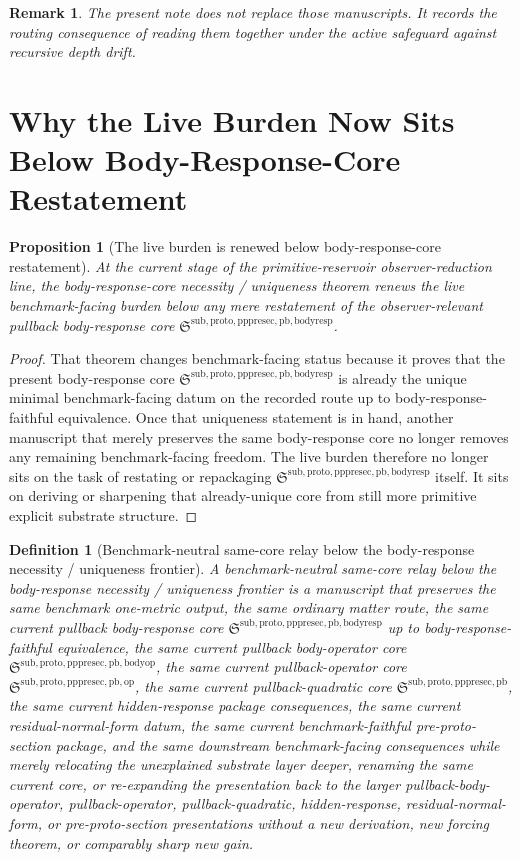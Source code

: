 \documentclass[11pt]{article}
\newcommand{\PrePreProtoSectionPullbackCore}{\mathfrak S^{\mathrm{sub,proto,pppresec,pb}}}
\newcommand{\PullbackOperatorCore}{\mathfrak S^{\mathrm{sub,proto,pppresec,pb,op}}}
\newcommand{\PullbackBodyOperatorCore}{\mathfrak S^{\mathrm{sub,proto,pppresec,pb,bodyop}}}
\newcommand{\PullbackBodyResponseCore}{\mathfrak S^{\mathrm{sub,proto,pppresec,pb,bodyresp}}}
\newtheorem{definition}{Definition}
\newtheorem{proposition}{Proposition}
\newtheorem{remark}{Remark}
\begin{document}
\begin{remark}
The present note does not replace those manuscripts. It records the routing consequence of reading them together under the active safeguard against recursive depth drift.
\end{remark}

\section{Why the Live Burden Now Sits Below Body-Response-Core Restatement}

\begin{proposition}[The live burden is renewed below body-response-core restatement]
At the current stage of the primitive-reservoir observer-reduction line, the body-response-core necessity / uniqueness theorem renews the live benchmark-facing burden below any mere restatement of the observer-relevant pullback body-response core \(\PullbackBodyResponseCore\).
\end{proposition}

\begin{proof}
That theorem changes benchmark-facing status because it proves that the present body-response core \(\PullbackBodyResponseCore\) is already the unique minimal benchmark-facing datum on the recorded route up to body-response-faithful equivalence. Once that uniqueness statement is in hand, another manuscript that merely preserves the same body-response core no longer removes any remaining benchmark-facing freedom. The live burden therefore no longer sits on the task of restating or repackaging \(\PullbackBodyResponseCore\) itself. It sits on deriving or sharpening that already-unique core from still more primitive explicit substrate structure.
\end{proof}

\begin{definition}[Benchmark-neutral same-core relay below the body-response necessity / uniqueness frontier]
A \emph{benchmark-neutral same-core relay below the body-response necessity / uniqueness frontier} is a manuscript that preserves the same benchmark one-metric output, the same ordinary matter route, the same current pullback body-response core \(\PullbackBodyResponseCore\) up to body-response-faithful equivalence, the same current pullback body-operator core \(\PullbackBodyOperatorCore\), the same current pullback-operator core \(\PullbackOperatorCore\), the same current pullback-quadratic core \(\PrePreProtoSectionPullbackCore\), the same current hidden-response package consequences, the same current residual-normal-form datum, the same current benchmark-faithful pre-proto-section package, and the same downstream benchmark-facing consequences while merely relocating the unexplained substrate layer deeper, renaming the same current core, or re-expanding the presentation back to the larger pullback-body-operator, pullback-operator, pullback-quadratic, hidden-response, residual-normal-form, or pre-proto-section presentations without a new derivation, new forcing theorem, or comparably sharp new gain.
\end{definition}
\end{document}
